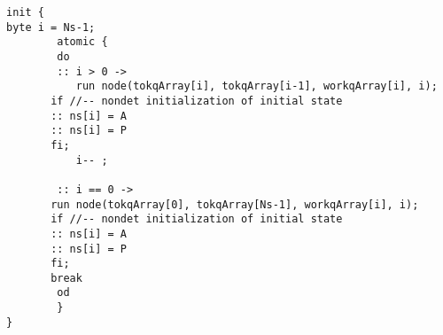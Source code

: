 \documentclass[11pt]{article}
\begin{document}
\begin{enumerate}
\begin{enumerate}
\begin{enumerate}
    \end{enumerate}
  \end{enumerate}

  \begin{scriptsize}  
\begin{verbatim}
init {
byte i = Ns-1;
        atomic {
        do
        :: i > 0 ->     
           run node(tokqArray[i], tokqArray[i-1], workqArray[i], i);
	   if //-- nondet initialization of initial state
	   :: ns[i] = A 
	   :: ns[i] = P
	   fi;
           i-- ;	   
	   
        :: i == 0 ->
	   run node(tokqArray[0], tokqArray[Ns-1], workqArray[i], i);
	   if //-- nondet initialization of initial state
	   :: ns[i] = A
	   :: ns[i] = P
	   fi;	   
	   break
        od
        }
}
\end{verbatim}
  \end{scriptsize}
  

\begin{minipage}{\minpagw}
\end{minipage}

\end{enumerate}
\end{document}
